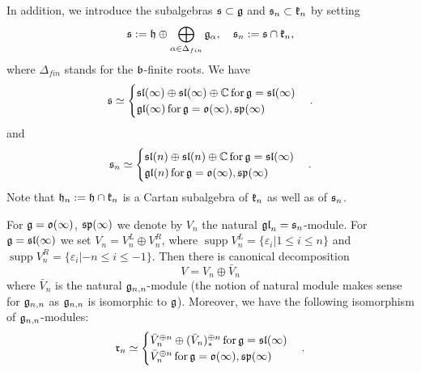 \documentclass[12pt]{amsart}
\def\mathbb{\Bbb}
\def\mathfrak{\frak}
\theoremstyle{plain} %
\numberwithin{equation}{section}
\theoremstyle{definition}
\theoremstyle{remark}
\theoremstyle{plain} %
\newcommand{\fg}{\mathfrak{g}}
\newcommand{\fk}{\mathfrak{k}}
\newcommand{\fs}{\mathfrak{s}}
\newcommand{\fr}{\mathfrak{r}}
\newcommand{\fb}{\mathfrak{b}}
\newcommand{\fh}{\mathfrak{h}}
\begin{document}
In addition, we introduce the  subalgebras $\fs\subset\fg$ and $\fs_n\subset\fk_n$ by setting
$$\fs:=\fh\oplus\bigoplus_{\alpha\in\Delta_{fin}}\fg_{\alpha},\quad\fs_n:=\fs\cap\fk_n,$$
where $\Delta_{fin}$ stands for the $\fb$-finite roots.
We have
$$\fs\simeq\begin{cases}\mathfrak{sl}(\infty)\oplus\mathfrak{sl}(\infty)\oplus\mathbb C\,\text{for}\, \fg=\mathfrak{sl}(\infty)\\ \mathfrak{gl}(\infty)\,\text{for}\, \fg=\mathfrak{o}(\infty), \mathfrak{sp}(\infty)\end{cases}.$$
and
$$\fs_n\simeq\begin{cases}\mathfrak{sl}(n)\oplus\mathfrak{sl}(n)\oplus\mathbb C\,\text{for}\, \fg=\mathfrak{sl}(\infty)\\ \mathfrak{gl}(n)\,\text{for}\, \fg=\mathfrak{o}(\infty), \mathfrak{sp}(\infty)\end{cases}.$$
  Note that $\fh_n:=\fh\cap\fk_n$ is a Cartan subalgebra of $\fk_n$ as well as of $\fs_n$.

For $\fg=\mathfrak o(\infty)$, $\mathfrak{sp}(\infty)$ we denote  by $V_n$ the natural $\mathfrak{gl}_n = \fs_n$-module. For $\fg=\mathfrak{sl}(\infty)$ we set $V_n=V_n^L\oplus V_n^R$, where $\operatorname{supp} V_n^L= \{\varepsilon_i| 1\leq i \leq n\}$ and $\operatorname{supp} V_n^R= \{\varepsilon_i| -n\leq i \leq -1\}$. Then there is canonical decomposition $$V= V_n\oplus \bar{V}_n$$ where $\bar{V}_n$ is the natural $\fg_{n,n}$-module (the notion of natural module makes sense for $\fg_{n,n}$ as $\fg_{n,n}$ is isomorphic to $\fg$). Moreover, we have the following isomorphism of $\fg_{n,n}$-modules:
$$\fr_n\simeq\begin{cases}\bar{V}_n^{\oplus n}\oplus (\bar V_n)_*^{\oplus n} \,\text{for}\, \fg=\mathfrak{sl}(\infty)\\ \bar V_n^{\oplus n}\,\text{for}\,\fg=\mathfrak{o}(\infty),\mathfrak{sp}(\infty)\end{cases}.$$
\end{document}
